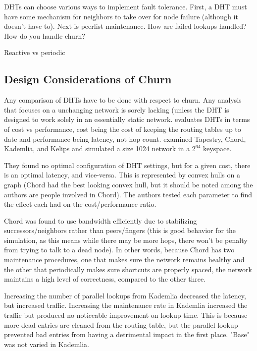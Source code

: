 \documentclass[10pt,letterpaper]{report}
\begin{document}
DHTs can choose various ways to implement fault tolerance.  First, a DHT must have some mechanism for neighbors to take over for node failure (although it doesn't have to).  Next is peerlist maintenance.  How are failed lookups handled?  How do you handle churn?


Reactive vs periodic


\subsection{Design Considerations of Churn}

Any comparison of DHTs have to be done with respect to churn.    Any analysis  that focuses on a unchanging network is sorely lacking (unless the DHT is designed to work solely in an essentially static network. \cite{lichurn}  evaluates DHTs in terms of cost vs performance, cost being the cost of keeping the routing tables up to date and performance being latency, not hop count.  \cite{lichurn} examined Tapestry, Chord, Kademlia, and Kelips and simulated a size 1024 network in a $2^64$ keyspace.   

They found no optimal configuration of DHT settings, but for a given cost, there is an optimal latency, and vice-versa.  This is represented by convex hulls on a graph (Chord had the best looking convex hull, but it should be noted among the authors are people involved in Chord).   The authors tested each parameter to find the effect each had on the cost/performance ratio.

Chord was found to use bandwidth efficiently due to stabilizing successors/neighbors rather than peers/fingers  (this is good behavior for the simulation, as this means while there may be more hops, there won't be penalty from trying to talk to a dead node).  In other words, because Chord has two maintenance procedures, one that makes sure the network remains healthy and the other that periodically makes sure shortcuts are properly spaced, the network maintains a high level of correctness, compared to the other three.

Increasing the number of parallel lookups from Kademlia decreased the latency, but increased traffic.  Increasing the maintenance rate in Kademlia increased the traffic but produced no noticeable improvement on lookup time.  This is because more dead entries are cleaned from the routing table, but the parallel lookup prevented bad entries from having a detrimental impact in the first place.  "Base" was not varied in Kademlia.
\end{document}
